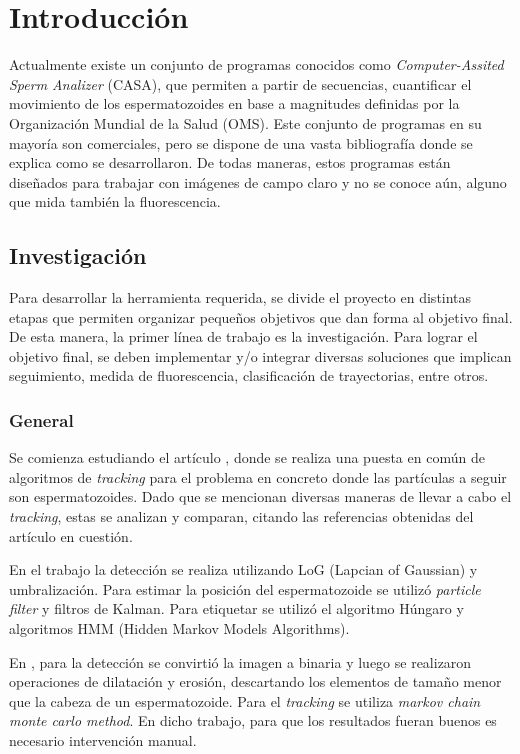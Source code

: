 \chapter{Introducción}

Actualmente existe un conjunto de programas conocidos como \textit{Computer-Assited Sperm Analizer} (CASA), que permiten a partir de secuencias, cuantificar el movimiento de los espermatozoides en base a magnitudes definidas por la Organización Mundial de la Salud (OMS). Este conjunto de programas en su mayoría son comerciales, pero se dispone de una vasta bibliografía donde se explica como se desarrollaron. De todas maneras, estos programas están diseñados para trabajar con imágenes de campo claro y no se conoce aún, alguno que mida también la fluorescencia.

\section{Investigación}
Para desarrollar la herramienta requerida, se divide el proyecto en distintas etapas que permiten organizar pequeños objetivos que dan forma al objetivo final. De esta manera, la primer línea de trabajo es la investigación. Para lograr el objetivo final, se deben implementar y/o integrar diversas soluciones que implican seguimiento, medida de fluorescencia, clasificación de trayectorias, entre otros. 

\subsection{General}

Se comienza estudiando el artículo \cite{survery}, donde se realiza una puesta en común de algoritmos de \textit{tracking} para el problema en concreto donde las partículas a seguir son espermatozoides. Dado que se mencionan diversas maneras de llevar a cabo el \textit{tracking}, estas se analizan y comparan, citando las referencias obtenidas del artículo en cuestión. 

En el trabajo \cite{sorensen} la detección se realiza utilizando LoG (Lapcian of Gaussian) y umbralización. Para estimar la posición del espermatozoide se utilizó \textit{particle filter} y filtros de Kalman. Para etiquetar se utilizó el algoritmo Húngaro y algoritmos HMM (Hidden Markov Models Algorithms). 

En \cite{Tomlinson}, para la detección se convirtió la imagen a binaria y luego se realizaron operaciones de dilatación y erosión, descartando los elementos de tamaño menor que la cabeza de un espermatozoide. Para el \textit{tracking} se utiliza \textit{markov chain monte carlo method}. En dicho trabajo, para que los resultados fueran buenos es necesario intervención manual. 

